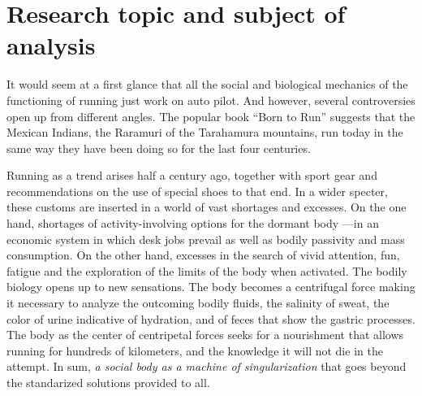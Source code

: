 \chapter*{Research topic and subject of analysis} 

It would seem at a first glance that all the social and biological mechanics
of the functioning of running just work on auto%
pilot. And however,
several controversies open up from different angles. The popular book “Born
to Run” suggests that the Mexican Indians, the Raramuri of the Tarahamura
mountains, run today in the same way they have been  doing so for  the last four
centuries.

Running as a trend arises half a century ago, together with sport gear
and recommendations on the use of special shoes to that end. In a wider
specter, these customs are inserted in a world of vast shortages and excesses.
On the one hand, shortages of activity-involving options for the dormant body
---in an economic system in which desk jobs prevail as well as  bodily passivity and mass
consumption. On the other hand, excesses in the search of vivid attention, fun,
fatigue and the exploration of the limits of the body when activated. The bodily
biology opens up to new sensations. The body becomes a centrifugal force
making it necessary to analyze the outcoming bodily fluids, the salinity of sweat,
the color of urine indicative of hydration, and of feces that show the gastric
processes. The body as the center of centripetal forces seeks for a nourishment
that allows running for hundreds of kilometers, and the knowledge it will not
die in the attempt. In sum, \textit{a social body as a machine of singularization} that
goes beyond the standarized solutions provided to all.


